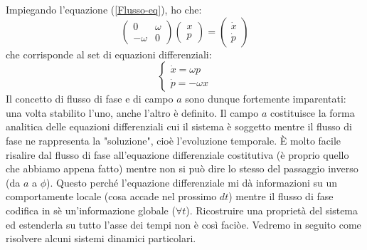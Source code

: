 \documentclass[a4paper,openany]{article}
\begin{document}
	Impiegando l'equazione (\ref{Flusso-eq}), ho che:
	$$
	\begin{pmatrix}
		0 &  \omega \\
		-\omega & 0
	\end{pmatrix}
	\begin{pmatrix}
		x \\
		p
	\end{pmatrix}
	= 
	\begin{pmatrix}
		\dot{x} \\ \dot{p}
	\end{pmatrix}
	$$
	che corrisponde al set di equazioni differenziali:
	\begin{equation}
		\begin{cases}
			\dot{x} = \omega p \\
			\dot{p} = -\omega x
		\end{cases}
	\end{equation}
	Il concetto di flusso di fase e di campo $a$ sono dunque fortemente imparentati: una volta stabilito l'uno, anche l'altro è definito. Il campo $a$ costituisce la forma analitica delle equazioni differenziali cui il sistema è soggetto mentre il flusso di fase ne rappresenta la "soluzione", cioè l'evoluzione temporale. È molto facile risalire dal flusso di fase all'equazione differenziale costitutiva (è proprio quello che abbiamo appena fatto) mentre non si può dire lo stesso del passaggio inverso (da $a$ a $\phi$). Questo perché l'equazione differenziale mi dà informazioni su un comportamente locale (cosa accade nel prossimo $dt$) mentre il flusso di fase codifica in sè un'informazione globale ($\forall t$). Ricostruire una proprietà del sistema ed estenderla su tutto l'asse dei tempi non è così faciòe. Vedremo in seguito come risolvere alcuni sistemi dinamici particolari.
\end{document}
